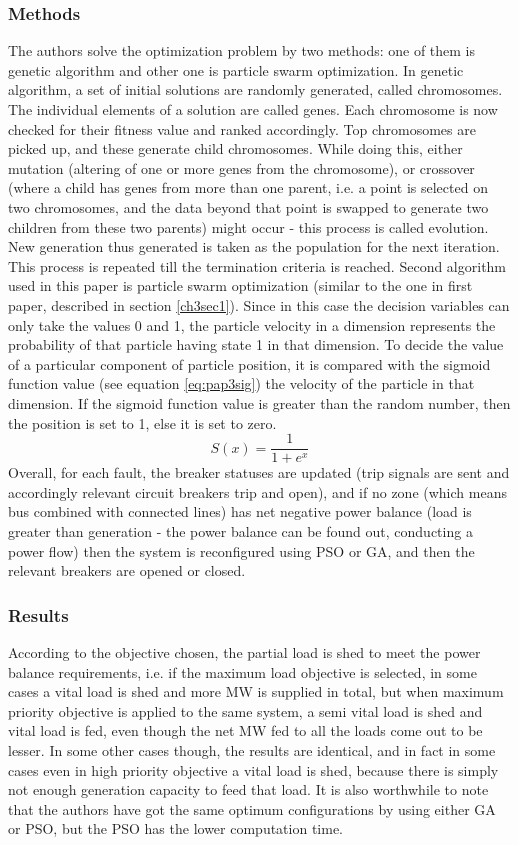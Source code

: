 \subsubsection{Methods}
The authors solve the optimization problem by two methods: one of them is genetic algorithm and other one is particle swarm optimization. In genetic algorithm, a set of initial solutions are randomly generated, called chromosomes. The individual elements of a solution are called genes. Each chromosome is now checked for their fitness value and ranked accordingly. Top chromosomes are picked up, and these generate child chromosomes. While doing this, either mutation (altering of one or more genes from the chromosome), or crossover (where a child has genes from more than one parent, i.e. a point is selected on two chromosomes, and the data beyond that point is swapped to generate two children from these two parents) might occur -  this process is called evolution. New generation thus generated is taken as the population for the next iteration. This process is repeated till the termination criteria is reached. Second algorithm used in this paper is particle swarm optimization (similar to the one in first paper, described in section \ref{ch3sec1}). Since in this case the decision variables can only take the values 0 and 1, the particle velocity in a dimension represents the probability of that particle having state 1 in that dimension. To decide the value of a particular component of particle position, it is compared with the sigmoid function value (see equation \eqref{eq:pap3sig}) the velocity of the particle in that dimension. If the sigmoid function value is greater than the random number, then the position is set to 1, else it is set to zero.\\
\begin{equation}
\label{eq:pap3sig}
S(x) = \frac{1}{1+e^x}
\end{equation}
Overall, for each fault, the breaker statuses are updated (trip signals are sent and accordingly relevant circuit breakers trip and open), and if no zone (which means bus combined with connected lines) has net negative power balance (load is greater than generation - the power balance can be found out, conducting a power flow) then the system is reconfigured using PSO or GA, and then the relevant breakers are opened or closed.
\subsubsection{Results}
According to the objective chosen, the partial load is shed to meet the power balance requirements, i.e. if the maximum load objective is selected, in some cases a vital load is shed and more MW is supplied in total, but when maximum priority objective is applied to the same system, a semi vital load is shed and vital load is fed, even though the net MW fed to all the loads come out to be lesser. In some other cases though, the results are identical, and in fact in some cases even in high priority objective a vital load is shed, because there is simply not enough generation capacity to feed that load. It is also worthwhile to note that the authors have got the same optimum configurations by using either GA or PSO, but the PSO has the lower computation time.\\
